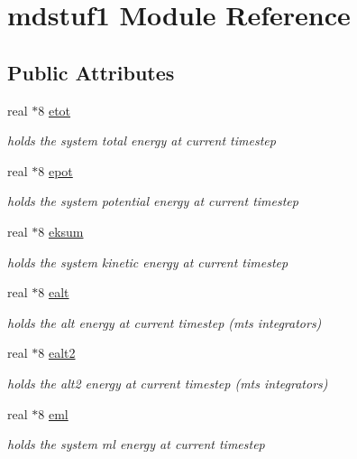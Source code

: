 \hypertarget{classmdstuf1}{\section{mdstuf1 Module Reference}
\label{classmdstuf1}
}
\subsection*{Public Attributes}
\begin{DoxyCompactItemize}
\item 
real $\ast$8 \hyperlink{classmdstuf1_a93644d9bdb342db25a67fd8ecbd48a76}{etot}
\begin{DoxyCompactList}\small\item\em holds the system total energy at current timestep \end{DoxyCompactList}\item 
real $\ast$8 \hyperlink{classmdstuf1_af9358d2e64b3367e7328433ec1f4112f}{epot}
\begin{DoxyCompactList}\small\item\em holds the system potential energy at current timestep \end{DoxyCompactList}\item 
real $\ast$8 \hyperlink{classmdstuf1_a22e8389cd89cc777b27e371c623921eb}{eksum}
\begin{DoxyCompactList}\small\item\em holds the system kinetic energy at current timestep \end{DoxyCompactList}\item 
real $\ast$8 \hyperlink{classmdstuf1_a016dbac1751502a1040045a7e90f1e22}{ealt}
\begin{DoxyCompactList}\small\item\em holds the alt energy at current timestep (mts integrators) \end{DoxyCompactList}\item 
real $\ast$8 \hyperlink{classmdstuf1_aa6bfc0bf5d1a33a2745ba6eb8b193eb7}{ealt2}
\begin{DoxyCompactList}\small\item\em holds the alt2 energy at current timestep (mts integrators) \end{DoxyCompactList}\item 
real $\ast$8 \hyperlink{classmdstuf1_a133be5118c4fa1b94112fe3edabc7490}{eml}
\begin{DoxyCompactList}\small\item\em holds the system ml energy at current timestep \end{DoxyCompactList}\item 

\end{DoxyCompactItemize}
